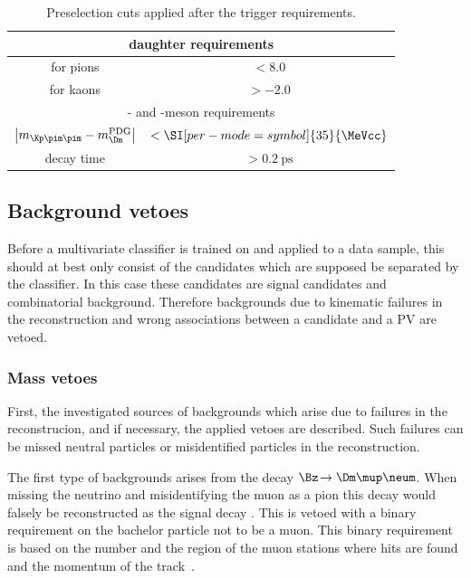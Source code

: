\begin{table}[tbp]
	\centering
	\caption{Preselection cuts applied after the trigger requirements.}
	\begin{tabular}{cc}
		\toprule
		\multicolumn{2}{c}{\Dm daughter requirements}\\
		\midrule
		\dllkpi for pions	& $<8.0$ \\
		\dllkpi for kaons 	& $>-2.0$ \\
		\midrule
		\multicolumn{2}{c}{\Dm- and \Bz-meson requirements}\\
		\midrule
		$\left|m_{\Kp\pim\pim}-m_\Dm^{\text{PDG}}\right|$	& $<\SI[per-mode=symbol]{35}{\MeVcc}$ \\
		\Bz decay time										& $>\SI{0.2}{\pico\second}$ \\
		\bottomrule
	\end{tabular}
	\label{tab:preselection}
\end{table}

\subsection{Background vetoes}
\label{sec:vetoes}

Before a multivariate classifier is trained on and applied to a data sample, this should at best only consist of the candidates which are supposed be separated by the classifier.
In this case these candidates are \BdToDpi signal candidates and combinatorial background.
Therefore backgrounds due to kinematic failures in the reconstruction and wrong associations between a \Bz candidate and a \ac{PV} are vetoed.

\subsubsection*{Mass vetoes}

First, the investigated sources of backgrounds which arise due to failures in the reconstrucion, and if necessary, the applied vetoes are described.
Such failures can be missed neutral particles or misidentified particles in the reconstruction.

The first type of backgrounds arises from the decay $\Bz\!\to\Dm\mup\neum$. When missing the neutrino and misidentifying the muon as a pion this decay would falsely be reconstructed as the signal decay \BdToDpi.
This is vetoed with a binary requirement on the bachelor particle not to be a muon.
This binary requirement is based on the number and the region of the muon stations where hits are found and the momentum of the track~\cite{Archilli:2013npa}.

